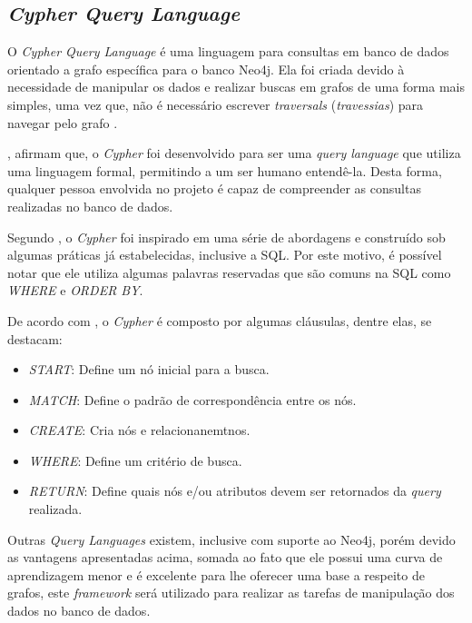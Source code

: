 \subsection{\textit{Cypher Query Language}}

\par O \textit{Cypher Query Language} é uma linguagem para consultas em banco de dados orientado a grafo específica para o banco Neo4j. Ela foi criada devido à necessidade de manipular os dados e realizar buscas em grafos de uma forma mais simples, uma vez que, não é necessário escrever \textit{traversals} (\textit{travessias}) para navegar pelo grafo \cite{neo4j_team_manual}.


\par {}, afirmam que, o \textit{Cypher} foi desenvolvido para ser uma \textit{query language} que utiliza uma linguagem formal, permitindo a um ser humano entendê-la. Desta forma, qualquer pessoa envolvida no projeto é capaz de compreender as consultas realizadas no banco de dados. 

\par Segundo , o \textit{Cypher} foi inspirado em uma série de abordagens e construído sob algumas práticas já estabelecidas, inclusive a SQL. Por este motivo, é possível notar que ele utiliza algumas palavras reservadas que são comuns na SQL como \textit{WHERE} e \textit{ORDER BY}.

\par De acordo com , o \textit{Cypher} é composto por algumas cláusulas, dentre elas, se destacam:

\begin{itemize}
	\item \textit{START}: Define um nó inicial para a busca.
	\item \textit{MATCH}: Define o padrão de correspondência entre os nós.
	\item \textit{CREATE}: Cria nós e relacionanemtnos.
	\item \textit{WHERE}: Define um critério de busca.
	\item \textit{RETURN}: Define quais nós e/ou atributos devem ser retornados da \textit{query} realizada. 
\end{itemize} 

\par Outras \textit{Query Languages} existem, inclusive com suporte ao Neo4j, porém devido as vantagens apresentadas acima, somada ao fato que ele possui uma curva de aprendizagem menor e é excelente para lhe oferecer uma base a respeito de grafos,  este \textit{framework} será utilizado para realizar as tarefas de manipulação dos dados no banco de dados.
